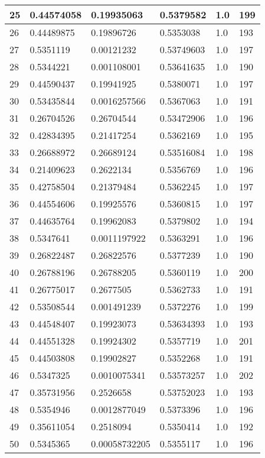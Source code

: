 \begin{longtable}{|l|l|l|l|l|l|}
25 & 0.44574058 & 0.19935063 & 0.5379582 & 1.0 & 199 \\ \hline 
26 & 0.44489875 & 0.19896726 & 0.5353038 & 1.0 & 193 \\ \hline 
27 & 0.5351119 & 0.00121232 & 0.53749603 & 1.0 & 197 \\ \hline 
28 & 0.5344221 & 0.001108001 & 0.53641635 & 1.0 & 190 \\ \hline 
29 & 0.44590437 & 0.19941925 & 0.5380071 & 1.0 & 197 \\ \hline 
30 & 0.53435844 & 0.0016257566 & 0.5367063 & 1.0 & 191 \\ \hline 
31 & 0.26704526 & 0.26704544 & 0.53472906 & 1.0 & 196 \\ \hline 
32 & 0.42834395 & 0.21417254 & 0.5362169 & 1.0 & 195 \\ \hline 
33 & 0.26688972 & 0.26689124 & 0.53516084 & 1.0 & 198 \\ \hline 
34 & 0.21409623 & 0.2622134 & 0.5356769 & 1.0 & 196 \\ \hline 
35 & 0.42758504 & 0.21379484 & 0.5362245 & 1.0 & 197 \\ \hline 
36 & 0.44554606 & 0.19925576 & 0.5360815 & 1.0 & 197 \\ \hline 
37 & 0.44635764 & 0.19962083 & 0.5379802 & 1.0 & 194 \\ \hline 
38 & 0.5347641 & 0.0011197922 & 0.5363291 & 1.0 & 196 \\ \hline 
39 & 0.26822487 & 0.26822576 & 0.5377239 & 1.0 & 190 \\ \hline 
40 & 0.26788196 & 0.26788205 & 0.5360119 & 1.0 & 200 \\ \hline 
41 & 0.26775017 & 0.2677505 & 0.5362733 & 1.0 & 191 \\ \hline 
42 & 0.53508544 & 0.001491239 & 0.5372276 & 1.0 & 199 \\ \hline 
43 & 0.44548407 & 0.19923073 & 0.53634393 & 1.0 & 193 \\ \hline 
44 & 0.44551328 & 0.19924302 & 0.5357719 & 1.0 & 201 \\ \hline 
45 & 0.44503808 & 0.19902827 & 0.5352268 & 1.0 & 191 \\ \hline 
46 & 0.5347325 & 0.0010075341 & 0.53573257 & 1.0 & 202 \\ \hline 
47 & 0.35731956 & 0.2526658 & 0.53752023 & 1.0 & 193 \\ \hline 
48 & 0.5354946 & 0.0012877049 & 0.5373396 & 1.0 & 196 \\ \hline 
49 & 0.35611054 & 0.2518094 & 0.5350414 & 1.0 & 192 \\ \hline 
50 & 0.5345365 & 0.00058732205 & 0.5355117 & 1.0 & 196 \\ \hline 
\end{longtable}